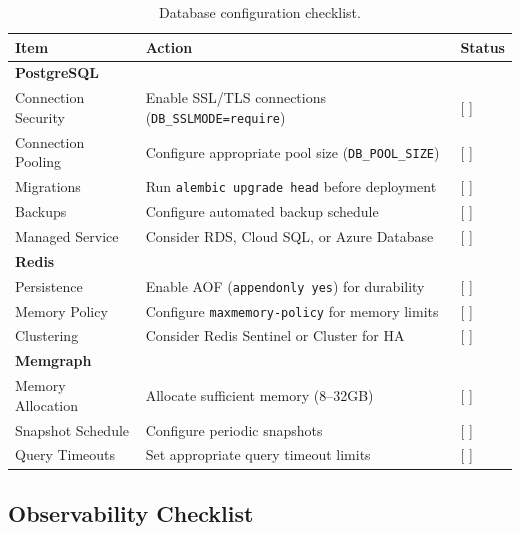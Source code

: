 \begin{table}[ht]
\centering
\caption{Database configuration checklist.}
\label{tab:database-checklist}
\small
\begin{tabularx}{\textwidth}{lXl}
\hline
\textbf{Item} & \textbf{Action} & \textbf{Status} \\
\hline
\multicolumn{3}{l}{\textbf{PostgreSQL}} \\
Connection Security & Enable SSL/TLS connections (\texttt{DB\_SSLMODE=require}) & [ ] \\
Connection Pooling & Configure appropriate pool size (\texttt{DB\_POOL\_SIZE}) & [ ] \\
Migrations & Run \texttt{alembic upgrade head} before deployment & [ ] \\
Backups & Configure automated backup schedule & [ ] \\
Managed Service & Consider RDS, Cloud SQL, or Azure Database & [ ] \\
\hline
\multicolumn{3}{l}{\textbf{Redis}} \\
Persistence & Enable AOF (\texttt{appendonly yes}) for durability & [ ] \\
Memory Policy & Configure \texttt{maxmemory-policy} for memory limits & [ ] \\
Clustering & Consider Redis Sentinel or Cluster for HA & [ ] \\
\hline
\multicolumn{3}{l}{\textbf{Memgraph}} \\
Memory Allocation & Allocate sufficient memory (8--32GB) & [ ] \\
Snapshot Schedule & Configure periodic snapshots & [ ] \\
Query Timeouts & Set appropriate query timeout limits & [ ] \\
\hline
\end{tabularx}
\end{table}

\subsection{Observability Checklist}

